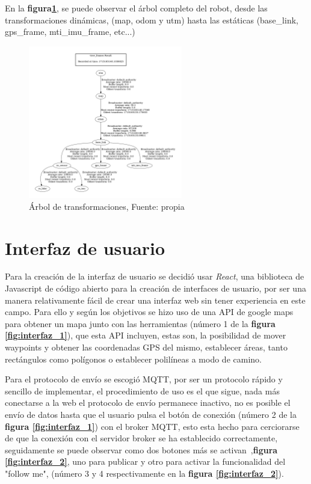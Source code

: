 En la  \textbf{figura\ref{fig:arbol_urdf}}, se puede observar el árbol completo del robot, desde las transformaciones dinámicas, 
(map, odom y utm) hasta las estáticas (base\_link, gps\_frame, mti\_imu\_frame, etc...)

\begin{figure}[H]
    \centering
    \includegraphics[width=0.6\textwidth]{images/arbol_transformaciones_hunter.jpg}
    \caption{Árbol de transformaciones, Fuente: propia}
    \label{fig:arbol_urdf}
\end{figure}

\newpage
\section{Interfaz de usuario}

Para la creación de la interfaz de usuario se decidió usar \textit{React}, una biblioteca de Javascript de código abierto para la creación de 
interfaces de usuario, por ser una manera relativamente fácil de crear una interfaz web sin tener experiencia en este campo. Para ello 
y según los objetivos se hizo uso de una API de google maps para obtener un mapa junto con las herramientas  
(número 1 de la \textbf{figura \ref{fig:interfaz_1}}), que esta API incluyen, estas son, la posibilidad de mover waypoints y obtener 
las coordenadas GPS del mismo, establecer áreas, tanto rectángulos como polígonos o establecer polilíneas a modo de camino.

Para el protocolo de envío se escogió MQTT, por ser un protocolo rápido y sencillo de implementar, el procedimiento de uso es el que 
sigue, nada más conectarse a la web el protocolo de envío permanece inactivo, no es posible el envío de datos hasta que el usuario pulsa el 
botón de conexión (número 2 de la \textbf{figura \ref{fig:interfaz_1}}) con el broker MQTT, esto esta hecho para cerciorarse de que 
la conexión con el servidor broker se ha establecido correctamente, seguidamente se puede observar como dos botones más se activan~,\textbf{figura \ref{fig:interfaz_2}}, 
uno para publicar y otro para activar la funcionalidad del "follow me", (número 3 y 4 respectivamente en la 
\textbf{ figura \ref{fig:interfaz_2}}).

